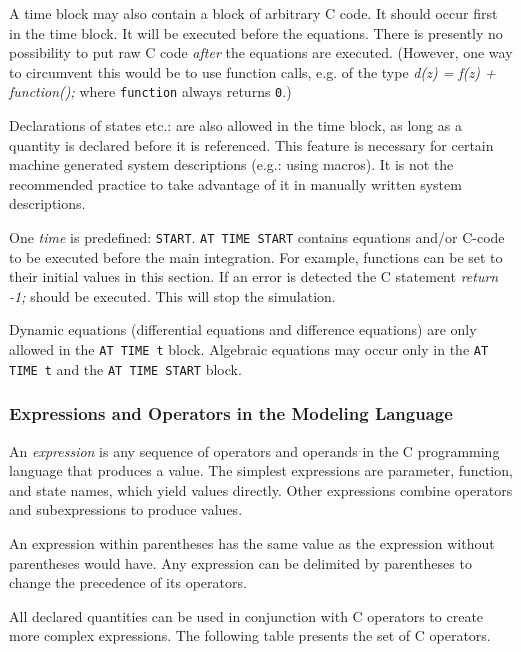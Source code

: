 A time block may also contain a block of arbitrary C code. It should
occur first in the time block. It will be executed before the
equations. There is presently no possibility to put raw C code
\emph{after} the equations are executed. (However, one way to
circumvent this would be to use function calls, e.g. of the type
\emph{d(z) = f(z) + function();} where \texttt{function} always returns
\texttt{0}.)

Declarations of states etc.: are also allowed in the time block, as
long as a quantity is declared before it is referenced. This feature
is necessary for certain machine generated system descriptions (e.g.:
using macros).  It is not the recommended practice to take advantage
of it in manually written system descriptions.

One \emph{time} is predefined: \texttt{START}. \texttt{AT TIME START}
contains equations and/or C-code to be executed before the main
integration. For example, functions can be set to their initial values
in this section. If an error is detected the C statement \emph{return
-1;} should be executed. This will stop the simulation.

Dynamic equations (differential equations and difference equations)
are only allowed in the \texttt{AT TIME t} block. Algebraic equations
may occur only in the \texttt{AT TIME t} and the \texttt{AT TIME START}
block.

\subsubsection{Expressions and Operators in the Modeling Language}
\label{Expressions and Operators in the System Description Language}

An \emph{expression} is any sequence of operators and operands in the C
programming language that produces a value. The simplest expressions
are parameter, function, and state names, which yield values
directly. Other expressions combine operators and subexpressions to
produce values.

An expression within parentheses has the same value as the expression
without parentheses would have. Any expression can be delimited by
parentheses to change the precedence of its operators.

All declared quantities can be used in conjunction with C operators to
create more complex expressions. The following table presents the set
of C operators.

